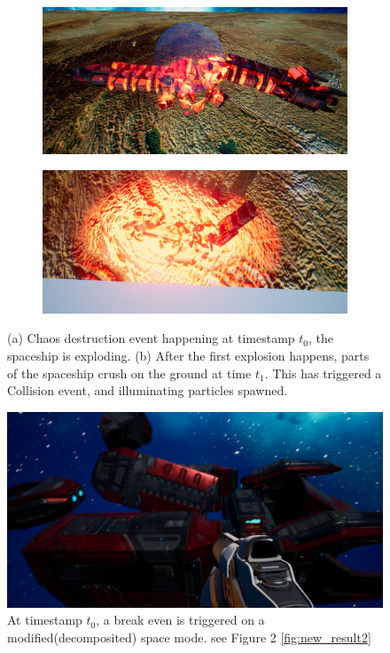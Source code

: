 \documentclass[sigconf]{acmart}
\begin{document}
\begin{figure}
\begin{subfigure}{.5\textwidth}
  \centering
  \includegraphics[width=\linewidth]{aaafiles/result1.png}
  \caption{}
\end{subfigure}%
\begin{subfigure}{.5\textwidth}
  \centering
  \includegraphics[width=\linewidth]{aaafiles/result2.png}
  \caption{}
\end{subfigure}
\caption{(a) Chaos destruction event happening at timestamp $t_0$, the spaceship is exploding. (b) After the first explosion happens, parts of the spaceship crush on the ground at time $t_1$. This has triggered a Collision event, and illuminating particles spawned.}
\label{fig:result}
\end{figure}

\begin{figure}
    \centering
    \includegraphics[width=.8\linewidth]{aaafiles/newresult.png}
    \caption{At timestamp $t_0$, a break even is triggered on a modified(decomposited) space mode. see Figure 2 \ref{fig:new_result2}}
    \label{fig:new_result}
\end{figure}
\end{document}
